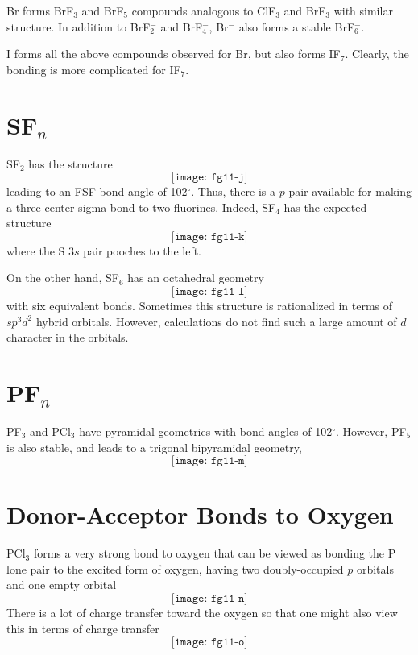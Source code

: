Br forms BrF$_3$ and BrF$_5$ compounds analogous to ClF$_3$ and BrF$_3$ 
with similar structure.  In addition to BrF$^-_2$ and BrF$^-_4$, 
Br$^-$ also forms a stable BrF$^-_6$.

I forms all the above compounds observed for Br, but also forms 
IF$_7$.  Clearly, the bonding is more complicated for IF$_7$.

\section{SF$_n$}

SF$_2$ has the structure
\begin{equation}
\texttt{[image: fg11-j]}
\end{equation}
leading to an FSF bond angle of 102$^{\circ}$.  Thus, there is a $p$ 
pair available for making a three-center sigma bond to two fluorines. 
Indeed, SF$_4$ has the expected structure
\begin{equation}
\texttt{[image: fg11-k]}
\end{equation}
where the S $3s$ pair pooches to the left.

On the other hand, SF$_6$ has an octahedral geometry
\begin{equation}
\texttt{[image: fg11-l]}
\end{equation}
with six equivalent bonds.  Sometimes this structure is rationalized in 
terms of $sp^3d^2$ hybrid orbitals.  However, calculations do not find 
such a large amount of $d$ character in the orbitals.

\section{PF$_n$}

PF$_3$ and PCl$_3$ have pyramidal geometries with bond angles of 
102$^{\circ}$.  However, PF$_5$ is also stable, and leads to a trigonal 
bipyramidal geometry,
\begin{equation}
\texttt{[image: fg11-m]}
\end{equation}

\section{Donor-Acceptor Bonds to Oxygen}

PCl$_3$ forms a very strong bond to oxygen that can be viewed as bonding the P 
lone pair to the excited form of oxygen, having two doubly-occupied $p$ 
orbitals and one empty orbital
\begin{equation}
\texttt{[image: fg11-n]}
\end{equation}
There is a lot of charge transfer toward the oxygen so that one might also 
view this in terms of charge transfer
\begin{equation}
\texttt{[image: fg11-o]}
\end{equation}


